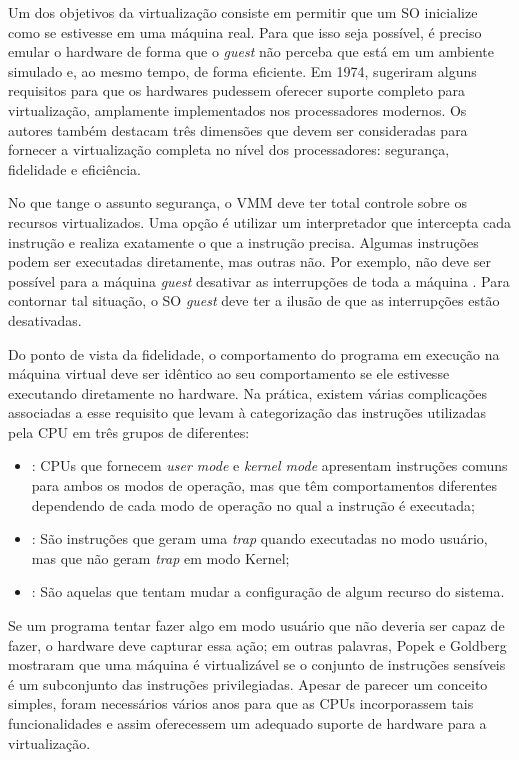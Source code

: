 Um dos objetivos da virtualização consiste em permitir que um SO inicialize
como se estivesse em uma máquina real. Para que isso seja possível, é preciso
emular o hardware de forma que o \emph{guest} não perceba que está em um
ambiente simulado e, ao mesmo tempo, de forma
eficiente. Em 1974, \citet{popek} sugeriram alguns requisitos para que os
hardwares pudessem oferecer suporte completo para virtualização,
amplamente implementados nos processadores modernos. Os autores também
destacam três dimensões que devem ser consideradas para fornecer a
virtualização completa no nível dos processadores: segurança, fidelidade e
eficiência.

No que tange o assunto segurança, o VMM deve ter total controle sobre os
recursos virtualizados. Uma opção é utilizar um interpretador que intercepta
cada instrução e realiza exatamente o que a instrução precisa. Algumas
instruções podem ser executadas diretamente, mas outras não. Por exemplo, não
deve ser possível para a máquina \emph{guest} desativar as interrupções de toda
a máquina \citep{tanenbaum}. Para contornar tal situação, o SO \emph{guest}
deve ter a ilusão de que as interrupções estão desativadas.

Do ponto de vista da fidelidade, o comportamento do programa em execução na
máquina virtual deve ser idêntico ao seu comportamento se ele estivesse executando
diretamente no hardware. Na prática, existem várias complicações associadas a
esse requisito que levam à categorização das instruções utilizadas pela CPU em
três grupos de diferentes:

\begin{itemize}
  \item {}: CPUs que fornecem \emph{user mode} e
        \emph{kernel mode} apresentam instruções comuns para ambos os modos de
        operação, mas que têm comportamentos diferentes dependendo de cada modo
        de operação no qual a instrução é executada;
  \item {}: São instruções que geram uma
        \emph{trap} quando executadas no modo usuário, mas que não geram
        \emph{trap} em modo Kernel;
  \item {}: São aquelas que
        tentam mudar a configuração de algum recurso do sistema.
\end{itemize}

Se um programa tentar fazer algo em modo usuário que não deveria ser capaz de
fazer, o hardware deve capturar essa ação; em outras palavras, Popek e Goldberg
mostraram que uma máquina é virtualizável se o conjunto de instruções sensíveis
é um subconjunto das instruções privilegiadas. Apesar de parecer um conceito
simples, foram necessários vários anos para que as CPUs incorporassem tais funcionalidades
e assim oferecessem um adequado suporte de hardware para a virtualização.

